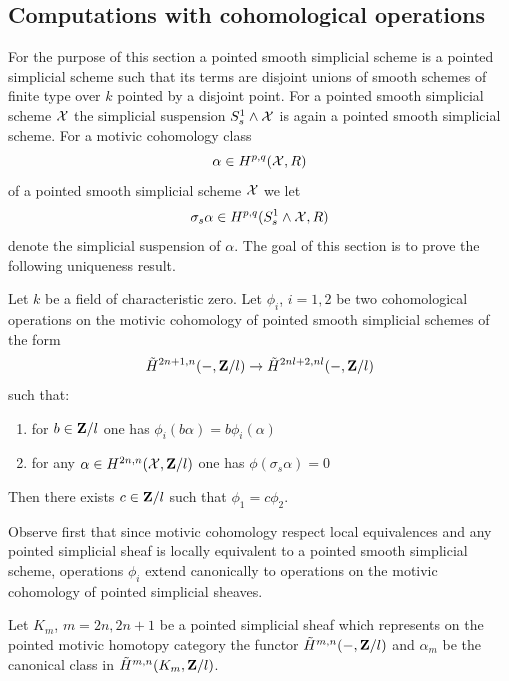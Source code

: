 \documentclass[11pt]{article}
\begin{document}
\subsection{Computations with cohomological operations}
%
%
For the purpose of this section a pointed smooth simplicial scheme is
a pointed simplicial scheme such that its terms are disjoint unions of
smooth schemes of finite type over $k$ pointed by a disjoint
point. For a pointed smooth simplicial scheme $\cal X$ the simplicial
suspension $S^1_s\wedge {\cal X}$ is again a pointed smooth simplicial
scheme. For a motivic cohomology class
%
$$\alpha\in H^{p,q}({\cal X},R)$$
%
of a pointed smooth simplicial scheme $\cal X$ we let 
%
$$\sigma_s\alpha\in H^{p,q}(S^1_s\wedge {\cal X},R)$$
%
denote the simplicial suspension of $\alpha$. The goal of this section
is to prove the following uniqueness result.
%
\begin{theorem}
 Let $k$ be a field of characteristic zero. Let
$\phi_i$, $i=1,2$ be two cohomological operations on the motivic
cohomology of pointed smooth simplicial schemes of the form
%
$$\tilde{H}^{2n+1,n}(-,{\bf Z\rm}/l)\rightarrow \tilde{H}^{2nl+2,nl}(-,{\bf Z\rm}/l)$$
%
such that:
%
\begin{enumerate}
\item for $b\in{\bf Z\rm}/l$ one has $\phi_i(b\alpha)=b\phi_i(\alpha)$
\item for any $\alpha\in H^{2n,n}({\cal X},{\bf Z\rm}/l)$ one has
$\phi(\sigma_s\alpha)=0$
\end{enumerate}
%
Then there exists $c\in {\bf Z\rm}/l$ such that $\phi_1=c\phi_2$.
\end{theorem}
%
Observe first that since motivic cohomology respect local equivalences
and any pointed simplicial sheaf is locally equivalent to a pointed
smooth simplicial scheme, operations $\phi_i$ extend canonically to
operations on the motivic cohomology of pointed simplicial sheaves.

Let $K_{m}$, $m=2n,2n+1$ be a pointed simplicial sheaf which
represents on the pointed motivic homotopy category the functor
$\tilde{H}^{m,n}(-,{\bf Z\rm}/l)$ and $\alpha_m$ be the canonical class in
$\tilde{H}^{m,n}(K_{m},{\bf Z\rm}/l)$.
\end{document}

